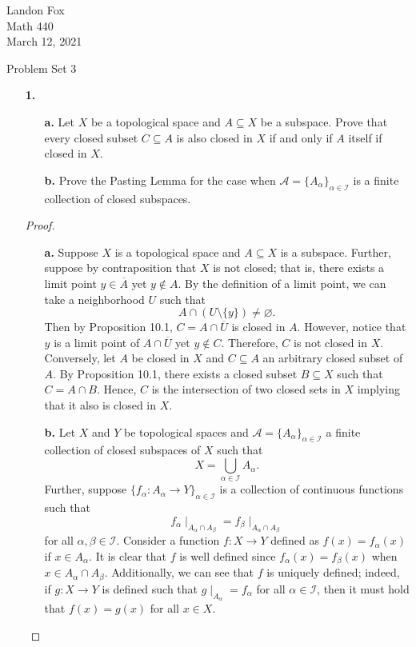 \documentclass[ 12pt ]{article}
\begin{document}
\noindent Landon Fox \\
\noindent Math 440 \\
\noindent March 12, 2021

\begin{center}
	\Large Problem Set 3
\end{center}

\begin{enumerate}
	\item[\textbf{1.}]
		\begin{enumerate}
			\item[\textbf{a.}] Let $X$ be a topological space and $A \subseteq X$ be a subspace. Prove that every closed subset $C \subseteq A$ is also closed in $X$ if and only if $A$
				itself if closed in $X$.
			\item[\textbf{b.}] Prove the Pasting Lemma for the case when $\mathcal{A} = \{ A_\alpha \}_{\alpha \in \mathcal{I}}$ is a finite collection of closed subspaces.
		\end{enumerate}

		\begin{proof} $ $
			\begin{enumerate}
				\item[\textbf{a.}] Suppose $X$ is a topological space and $A \subseteq X$ is a subspace. Further, suppose by contraposition that $X$ is not closed; that is, there exists
					a limit point $y \in \overline{A}$ yet $y \notin A$. By the definition of a limit point, we can take a neighborhood $U$ such that $$A \cap (U \setminus \{y\}) \neq
					\varnothing.$$ Then by Proposition 10.1, $C = A \cap \overline{U}$ is closed in $A$. However, notice that $y$ is a limit point of $A \cap \overline{U}$ yet $y \notin
					C$. Therefore, $C$ is not closed in $X$. \\

					Conversely, let $A$ be closed in $X$ and $C \subseteq A$ an arbitrary closed subset of $A$. By Proposition 10.1, there exists a closed subset $B \subseteq X$ such
					that $C = A \cap B$. Hence, $C$ is the intersection of two closed sets in $X$ implying that it also is closed in $X$.
			
				\item[\textbf{b.}] Let $X$ and $Y$ be topological spaces and $\mathcal{A} = \{ A_\alpha \}_{\alpha \in \mathcal{I}}$ a finite collection of closed subspaces of $X$
					such that $$X = \bigcup_{\alpha \in \mathcal{I}} A_\alpha.$$ Further, suppose $\{ f_\alpha : A_\alpha \to Y \}_{\alpha \in \mathcal{I}}$ is a collection of continuous
					functions such that $$f_\alpha \mid_{A_\alpha \cap A_\beta} = f_\beta \mid_{A_\alpha \cap A_\beta}$$ for all $\alpha, \beta \in \mathcal{I}$. Consider a function $f :
					X \to Y$ defined as $f(x) = f_\alpha(x)$ if $x \in A_\alpha$. It is clear that $f$ is well defined since $f_\alpha(x) = f_\beta(x)$ when $x \in A_\alpha \cap
					A_\beta$. Additionally, we can see that $f$ is uniquely defined; indeed, if $g : X \to Y$ is defined such that $g \mid_{A_\alpha} = f_\alpha$ for all $\alpha \in
					\mathcal{I}$, then it must hold that $f(x) = g(x)$ for all $x \in X$. \\


\end{enumerate}
\end{proof}
\end{enumerate}
\end{document}
